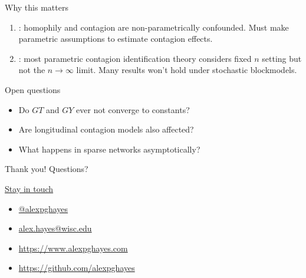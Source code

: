 \documentclass[aspectratio=169]{beamer}
\theoremstyle{remark}
\begin{document}
\begin{frame}{Why this matters}
    
    \cite{paul2022a}
    
    \begin{enumerate}
        \item \cite{shalizi2011,mcfowland2021}: homophily and contagion are non-parametrically confounded. Must make parametric assumptions to estimate contagion effects.
        \item \cite{bramoulle2020}: most parametric contagion identification theory considers fixed $n$ setting but not the $n \to \infty$ limit. Many results won't hold under stochastic blockmodels.
    \end{enumerate}
\end{frame}

\begin{frame}{Open questions}
    
    \begin{itemize}
        \item Do $GT$ and $GY$ ever not converge to constants?
        \item Are longitudinal contagion models also affected?
        \item What happens in sparse networks asymptotically?
    \end{itemize}
\end{frame}

\begin{frame}{Thank you! Questions?}
    
    \underline{Stay in touch}
    
    \begin{itemize}
        \item[]  \href{https://twitter.com/alexpghayes}{@alexpghayes}
        \item[]  \href{mailto:alex.hayes@wisc.edu}{alex.hayes@wisc.edu}
        \item[]  \url{https://www.alexpghayes.com}
        \item[]  \url{https://github.com/alexpghayes}
    \end{itemize}
    
\end{frame}

\appendix



\end{document}
